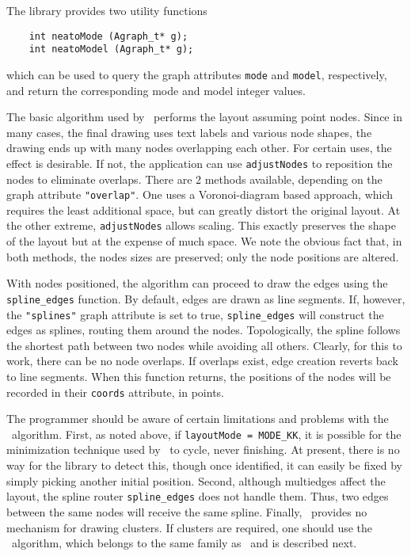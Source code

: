 The library provides two utility functions
\begin{verbatim}
    int neatoMode (Agraph_t* g);
    int neatoModel (Agraph_t* g);
\end{verbatim}
which can be used to query the graph attributes {\tt mode} and {\tt model},
respectively, and return the corresponding mode and model integer values.

The basic algorithm used by \neato\ performs the layout assuming
point nodes. Since in many cases, the final drawing uses text
labels and various node shapes, the drawing ends up with many
nodes overlapping each other. For certain uses, the effect is
desirable. If not, the application can use {\tt adjustNodes} to
reposition the nodes to eliminate overlaps. There are 2 methods
available, depending on the graph attribute {\tt "overlap"}.
One\cite{voronoi} uses a Voronoi-diagram based approach, 
which requires the least
additional space, but can greatly distort the original layout. At
the other extreme, {\tt adjustNodes} allows scaling\cite{scale}. This exactly
preserves the shape of the layout but at the expense of much space.
We note the obvious fact that, in both methods, the nodes sizes 
are preserved; only the node positions are altered.

With nodes positioned, the algorithm can proceed to draw the
edges using the {\tt spline\_edges} function. 
By default, edges are drawn as line
segments. If, however, the {\tt "splines"} graph attribute is
set to true, {\tt spline\_edges} will construct the edges as
splines\cite{paths}, 
routing them around the nodes. Topologically, the spline
follows the shortest path between two nodes while avoiding all others.
Clearly, for this to work, there can be no node overlaps. If overlaps
exist, edge creation reverts back to line segments.
When this function returns, the positions of the nodes will be recorded
in their {\tt coords} attribute, in points.

The programmer should be aware of certain limitations and
problems with the \neato\ algorithm. 
First, as noted above, if {\tt layoutMode = MODE\_KK}, 
it is possible for the minimization technique used by \neato\
to cycle, never finishing. At present, there
is no way for the library to detect this, though once identified,
it can easily be fixed by simply picking another initial position.
Second, although multiedges affect the layout,
the spline router {\tt spline\_edges} does not handle them. Thus,
two edges between the same nodes will receive the same spline.
Finally, \neato\ provides no mechanism for drawing clusters. 
If clusters are required, one should use the \fdp\ algorithm, which belongs
to the same family as \neato\ and is described next.

